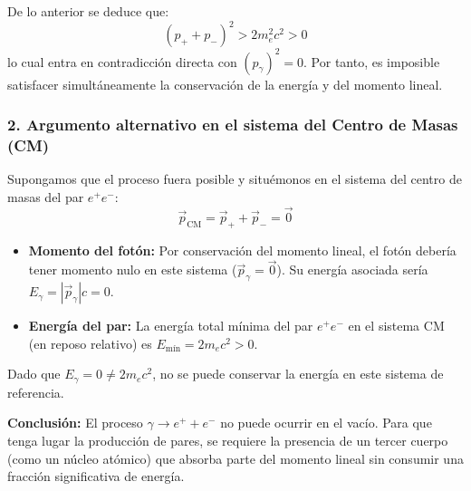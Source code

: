 \begin{problema}
De lo anterior se deduce que:
\[
(p_+ + p_-)^2 > 2 m_e^2 c^2 > 0
\]
lo cual entra en contradicción directa con $(p_\gamma)^2 = 0$. Por tanto, es imposible satisfacer simultáneamente la conservación de la energía y del momento lineal.

\subsubsection*{2. Argumento alternativo en el sistema del Centro de Masas (CM)}

Supongamos que el proceso fuera posible y situémonos en el sistema del centro de masas del par $e^+ e^-$:
\[
\vec{p}_{\text{CM}} = \vec{p}_+ + \vec{p}_- = \vec{0}
\]

\begin{itemize}
    \item \textbf{Momento del fotón:} Por conservación del momento lineal, el fotón debería tener momento nulo en este sistema ($\vec{p}_\gamma = \vec{0}$). Su energía asociada sería $E_\gamma = |\vec{p}_\gamma| c = 0$.
    \item \textbf{Energía del par:} La energía total mínima del par $e^+ e^-$ en el sistema CM (en reposo relativo) es $E_{\text{mín}} = 2 m_e c^2 > 0$.
\end{itemize}

Dado que $E_\gamma = 0 \neq 2 m_e c^2$, no se puede conservar la energía en este sistema de referencia.

\textbf{Conclusión:} El proceso $\gamma \rightarrow e^+ + e^-$ no puede ocurrir en el vacío. Para que tenga lugar la producción de pares, se requiere la presencia de un tercer cuerpo (como un núcleo atómico) que absorba parte del momento lineal sin consumir una fracción significativa de energía.
\end{problema}
